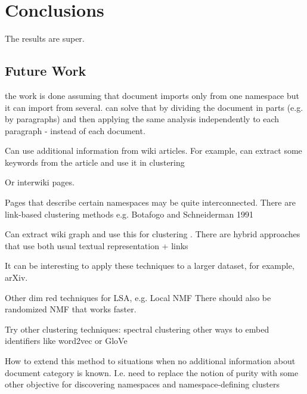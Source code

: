\section{Conclusions}

The results are super. 


\subsection{Future Work}





the work is done assuming that document imports only from one namespace
but it can import from several. can solve that by dividing the document
in parts (e.g. by paragraphs) and then applying the same analysis 
independently to each paragraph - instead of each document. 


Can use additional information from wiki articles. For example, can 
extract some keywords from the article and use it in clustering

Or interwiki pages.

Pages that describe certain namespaces may be quite interconnected.
There are link-based clustering methods e.g. Botafogo and Schneiderman 1991

Can extract wiki graph and use this for clustering .
There are hybrid approaches that use both usual textual representation  + links
\cite{oikonomakou2005review}


It can be interesting to apply these techniques to a larger dataset, for example, arXiv.

Other dim red techniques for LSA, e.g. Local NMF \cite{li2001learning}
There should also be randomized NMF that works faster. 


Try other clustering techniques: spectral clustering \cite{ng2002spectral}
other ways to embed identifiers like word2vec \cite{mikolov2013efficient} 
or GloVe \cite{pennington2014glove}


How to extend this method to situations when no additional information 
about document category is known. I.e. need to replace the notion of 
purity with some other objective for discovering namespaces and 
namespace-defining clusters




